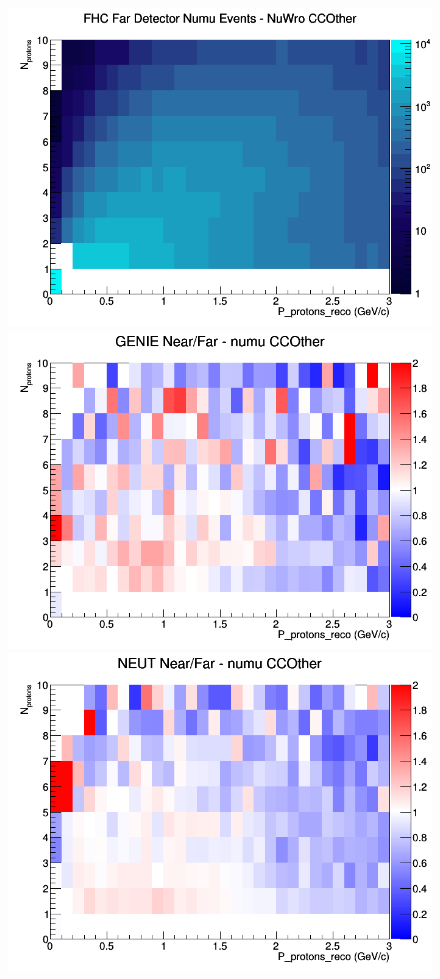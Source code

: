 \begin{figure}[h]
\endminipage
{}
\includegraphics[width=\linewidth]{eff_N_P/LAr/protons/CCOther_FHC_FD_numu_N_P_NuWro.png}
\endminipage
\newline
{}
\includegraphics[width=\linewidth]{eff_N_P/LAr/protons/ratios/CCOther_GENIE_numu_NF_N_P.png}
\endminipage
{}
\includegraphics[width=\linewidth]{eff_N_P/LAr/protons/ratios/CCOther_NEUT_numu_NF_N_P.png}

\end{figure}
